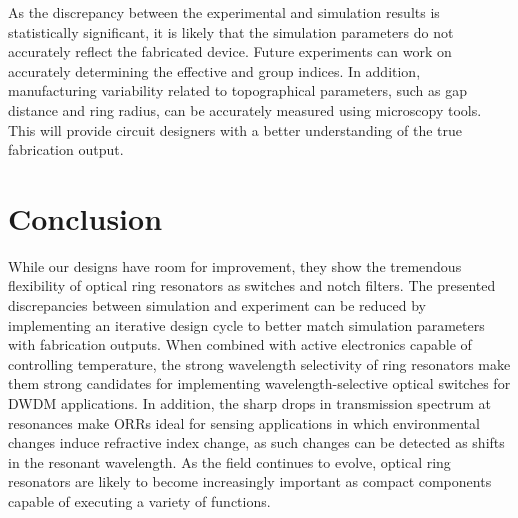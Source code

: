 \documentclass[letterpaper, 10 pt, conference]{ieeeconf}
\begin{document}
As the discrepancy between the experimental and simulation results is statistically significant, it is likely that the simulation parameters do not accurately reflect the fabricated device. Future experiments can work on accurately determining the effective and group indices. In addition, manufacturing variability related to topographical parameters, such as gap distance and ring radius, can be accurately measured using microscopy tools. This will provide circuit designers with a better understanding of the true fabrication output.

\section{Conclusion}
While our designs have room for improvement, they show the tremendous flexibility of optical ring resonators as switches and notch filters. The presented discrepancies between simulation and experiment can be reduced by implementing an iterative design cycle to better match simulation parameters with fabrication outputs. When combined with active electronics capable of controlling temperature, the strong wavelength selectivity of ring resonators make them strong candidates for implementing wavelength-selective optical switches for DWDM applications. In addition, the sharp drops in transmission spectrum at resonances make ORRs ideal for sensing applications in which environmental changes induce refractive index change, as such changes can be detected as shifts in the resonant wavelength. As the field continues to evolve, optical ring resonators are likely to become increasingly important as compact components capable of executing a variety of functions. 









\end{document}
